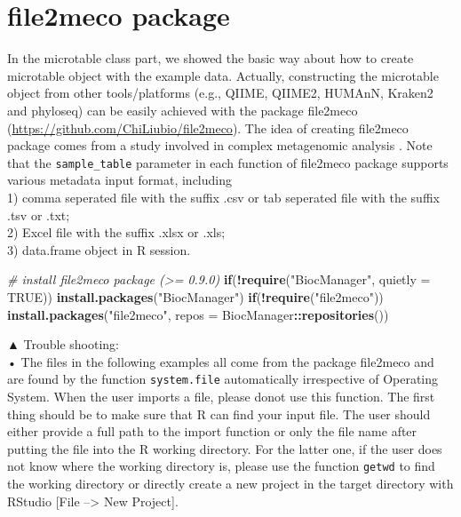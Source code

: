 \documentclass[
]{book}
\newenvironment{Shaded}{\begin{snugshade}}{\end{snugshade}}
\newcommand{\AttributeTok}[1]{\textcolor[rgb]{0.13,0.29,0.53}{#1}}
\newcommand{\CommentTok}[1]{\textcolor[rgb]{0.56,0.35,0.01}{\textit{#1}}}
\newcommand{\ConstantTok}[1]{\textcolor[rgb]{0.56,0.35,0.01}{#1}}
\newcommand{\ControlFlowTok}[1]{\textcolor[rgb]{0.13,0.29,0.53}{\textbf{#1}}}
\newcommand{\FunctionTok}[1]{\textcolor[rgb]{0.13,0.29,0.53}{\textbf{#1}}}
\newcommand{\NormalTok}[1]{#1}
\newcommand{\SpecialCharTok}[1]{\textcolor[rgb]{0.81,0.36,0.00}{\textbf{#1}}}
\newcommand{\StringTok}[1]{\textcolor[rgb]{0.31,0.60,0.02}{#1}}
\begin{document}
\chapter{file2meco package}\label{file2meco-package}

In the microtable class part, we showed the basic way about how to create microtable object with the example data.
Actually, constructing the microtable object from other tools/platforms (e.g., QIIME, QIIME2, HUMAnN, Kraken2 and phyloseq)
can be easily achieved with the package file2meco (\url{https://github.com/ChiLiubio/file2meco}).
The idea of creating file2meco package comes from a study involved in complex metagenomic analysis \citep{Liu_Microbial_2022}.
Note that the \texttt{sample\_table} parameter in each function of file2meco package supports various metadata input format, including\\
1) comma seperated file with the suffix .csv or tab seperated file with the suffix .tsv or .txt;\\
2) Excel file with the suffix .xlsx or .xls;\\
3) data.frame object in R session.

\begin{Shaded}
\begin{Highlighting}[]
\CommentTok{\# install file2meco package (\textgreater{}= 0.9.0)}
\ControlFlowTok{if}\NormalTok{(}\SpecialCharTok{!}\FunctionTok{require}\NormalTok{(}\StringTok{"BiocManager"}\NormalTok{, }\AttributeTok{quietly =} \ConstantTok{TRUE}\NormalTok{)) }\FunctionTok{install.packages}\NormalTok{(}\StringTok{"BiocManager"}\NormalTok{)}
\ControlFlowTok{if}\NormalTok{(}\SpecialCharTok{!}\FunctionTok{require}\NormalTok{(}\StringTok{"file2meco"}\NormalTok{)) }\FunctionTok{install.packages}\NormalTok{(}\StringTok{"file2meco"}\NormalTok{, }\AttributeTok{repos =}\NormalTok{ BiocManager}\SpecialCharTok{::}\FunctionTok{repositories}\NormalTok{())}
\end{Highlighting}
\end{Shaded}

▲ Trouble shooting:\\
• The files in the following examples all come from the package file2meco and are found by the function \texttt{system.file} automatically irrespective of Operating System.
When the user imports a file, please donot use this function.
The first thing should be to make sure that R can find your input file.
The user should either provide a full path to the import function or only the file name after putting the file into the R working directory.
For the latter one, if the user does not know where the working directory is,
please use the function \texttt{getwd} to find the working directory or directly create a new project in the target directory with RStudio {[}File --\textgreater{} New Project{]}.
\end{document}
